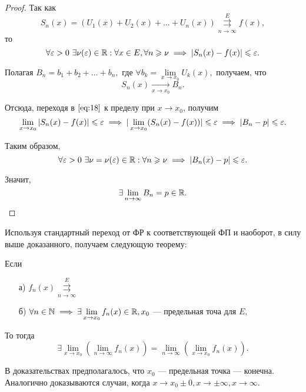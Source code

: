\documentclass[../../main.tex]{subfiles}
\begin{document}
\begin{proof}
Так как 
\[
S_n(x) = (U_1(x) + U_2(x) + \ldots + U_n(x)) \overset{E}{\underset{n \to 
\infty}\rightrightarrows} f(x),
\]
 то
\begin{equation} \label{eq:18}
	\forall \varepsilon > 0 \ \exists \nu(\varepsilon) \in \mathbb{R} : \forall x \in E, \forall n \geqslant 
	\nu \implies |S_n(x) - f(x)| \leqslant \varepsilon.
\end{equation}

	Полагая $B_n = b_1 + b_2 + \ldots + b_n,$ где $\forall b_k = \lim\limits_{x 
	\to x_0}U_k(x),$
получаем, что 
\[
	S_n(x) \underset{x \to x_0}\longrightarrow B_n.
\]

Отсюда, переходя в $\eqref{eq:18}$ к пределу при $x \to x_0$, получим
\[
 \lim_{x \to x_0}|S_n(x) - f(x)| \leqslant \varepsilon \implies
 |\lim_{x \to x_0}(S_n(x) - f(x))| \leqslant \varepsilon \implies |B_n - p| \leqslant \varepsilon.
\]

Таким образом, 
\[
\forall \eps > 0 \ \exists \nu = \nu(\eps) \in \R : \forall n \ge \nu \implies 
|B_n(x) - p| \le \eps.
\]

Значит, 
\[
\exists \lim_{n \to \infty} B_n = p \in \mathbb{R}.
\]
\end{proof}

\begin{rem}[1]
	Используя стандартный переход от ФР к соответствующей ФП и наоборот, в силу 
	выше доказанного, получаем следующую теорему:
\end{rem}
\begin{thm}
	Если
	\begin{enumerate}
		\item[а)] $f_n(x) \overset{E}{\underset{n \to \infty}\rightrightarrows}$
		\item[б)] $\forall n \in \mathbb{N} \implies \exists \lim\limits_{x\to x_0}f_n(x) 
		\in \mathbb{R}, x_0$ --- предельная точа для $E,$
	\end{enumerate} 
То тогда 
\[
	\exists \lim_{x \to x_0}(\lim_{n \to \infty}f_n(x)) = \lim_{n \to \infty}( 
	\lim_{x \to x_0}f_n(x)).
\]
\end{thm}

\begin{rem}
	В доказательствах предполагалось, что $x_0$ --- предельная точка --- конечна. 
	Аналогично доказываются случаи, когда $x \to x_0 \pm 0, x \to \pm \infty, x 
	\to \infty.$
\end{rem}
\end{document}
